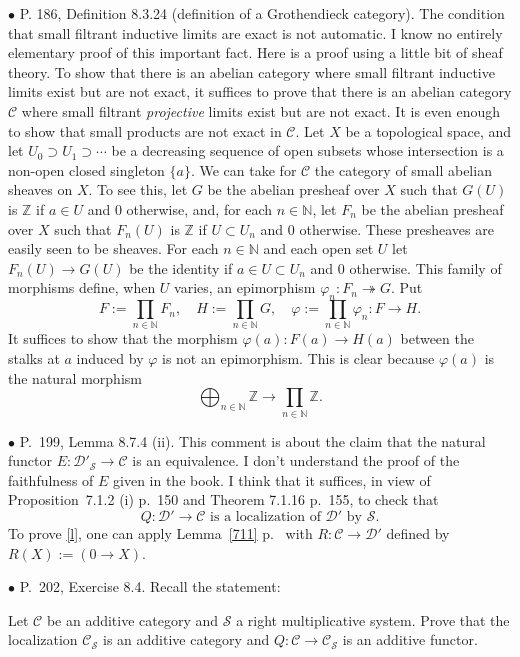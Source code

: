 \documentclass[12pt]{article}
\theoremstyle{remark}%
\newcommand{\bu}{\bullet}
\newcommand{\n}{\noindent}
\newcommand{\cc}{\mathcal}
\newcommand{\C}{\mathcal C}
\newcommand{\epi}{\twoheadrightarrow}
\newcommand{\p}{\varphi}
\newcommand{\be}{\begin{equation}}
\newcommand{\ee}{\end{equation}}
\newcommand{\pr}{Proposition}
\begin{document}
\n$\bu$ P. 186, Definition 8.3.24 (definition of a Grothendieck category). The condition that small filtrant inductive limits are exact is not automatic. I know no entirely elementary proof of this important fact. Here is a proof using a little bit of sheaf theory. To show that there is an abelian category where small filtrant inductive limits exist but are not exact, it suffices to prove that there is an abelian category $\C$ where small filtrant {\em projective} limits exist but are not exact. It is even enough to show that small products are not exact in $\C$. Let $X$ be a topological space, and let $U_0\supset U_1\supset\cdots$ be a decreasing sequence of open subsets whose intersection is a non-open closed singleton $\{a\}$. We can take for $\C$ the category of small abelian sheaves on $X$. To see this, let $G$ be the abelian presheaf over $X$ such that $G(U)$ is $\mathbb Z$ if $a\in U$ and 0 otherwise, and, for each $n\in\mathbb N$, let $F_n$ be the abelian presheaf over $X$ such that $F_n(U)$ is $\mathbb Z$ if $U\subset U_n$ and 0 otherwise. These presheaves are easily seen to be sheaves. For each $n\in\mathbb N$ and each open set $U$ let $F_n(U)\to G(U)$ be the identity if $a\in U\subset U_n$ and 0 otherwise. This family of morphisms define, when $U$ varies, an epimorphism $\p_n:F_n\epi G$. Put 
$$
F:=\prod_{n\in\mathbb N}F_n,\quad H:=\prod_{n\in\mathbb N}G,\quad\p:=\prod_{n\in\mathbb N}\p_n:F\to H.
$$ 
It suffices to show that the morphism $\p(a):F(a)\to H(a)$ between the stalks at $a$ induced by $\p$ is not an epimorphism. This is clear because $\p(a)$ is the natural morphism 
$$
\bigoplus_{n\in\mathbb N}\mathbb Z\to\prod_{n\in\mathbb N}\mathbb Z.
$$ 


\n$\bu$ P.~199, Lemma 8.7.4 (ii). This comment is about the claim that the natural functor $E:\cc D'_{\cc S}\to\C$ is an equivalence. I don't understand the proof of the faithfulness of $E$ given in the book. I think that it suffices, in view of \pr\ 7.1.2 (i) p.~150 and Theorem 7.1.16 p.~155, to check that 
%
\be\label{l}
Q:\cc D'\to\C\text{ is a localization of }\cc D'\text{ by }\cc S.
\ee
%
To prove \eqref{l}, one can apply Lemma~\ref{711} p.~\pageref{711} with $R:\C\to\cc D'$ defined by $R(X):=(0\to X)$. 


\n$\bu$ P.~202, Exercise 8.4. Recall the statement: 

Let $\C$ be an additive category and $\cc S$ a right multiplicative system. Prove that the localization $\C_{\cc S}$ is an additive category and $Q:\C\to\C_{\cc S}$ is an additive functor. 
\end{document}
